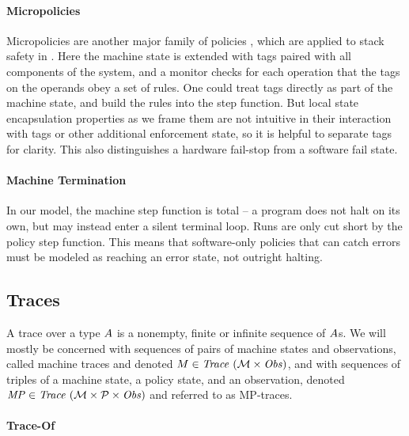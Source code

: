 \documentclass[acmsmall,review,anonymous]{acmart}\settopmatter{printfolios=true,printccs=false,printacmref=false}
\begin{document}
\paragraph*{Micropolicies}
%
Micropolicies are another major family of policies \citep{pump_oakland2015},
which are applied to stack safety in \citep{DBLP:conf/sp/RoesslerD18}.
Here the machine state is extended with tags paired with all components of the
system, and a monitor checks for each operation that the tags on the operands
obey a set of rules. One could treat tags directly as part of the machine
state, and build the rules into the step function. But local state
encapsulation properties as we frame them are not intuitive in their
interaction with tags or other additional enforcement state, so it is helpful
to separate tags for clarity. This also distinguishes a hardware fail-stop from
a software fail state.

\paragraph*{Machine Termination}

In our model, the machine step function is total -- a program does not halt
on its own, but may instead enter a silent terminal loop. Runs are only cut
short by the policy step function. This means that software-only policies that
can catch errors must be modeled as reaching an error state, not outright
halting.

\subsection{Traces}

A trace over a type $A$ is a nonempty, finite or infinite sequence of
$A$s. We will mostly be concerned with sequences of pairs of machine states
and observations, called machine traces and denoted $M \in \mathit{Trace}~({\mathcal M} \times \mathit{Obs})$,
and with sequences of triples of a machine state, a policy state, and an
observation, denoted $\mathit{MP} \in \mathit{Trace}~({\mathcal M} \times \mathcal{P} \times \mathit{Obs})$ and referred to as MP-traces.


\paragraph*{Trace-Of}
\end{document}

